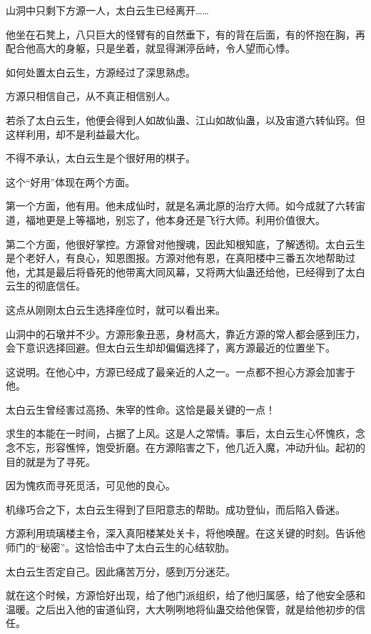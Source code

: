 
\begin{this_body}

山洞中只剩下方源一人，太白云生已经离开……

他坐在石凳上，八只巨大的怪臂有的自然垂下，有的背在后面，有的怀抱在胸，再配合他高大的身躯，只是坐着，就显得渊渟岳峙，令人望而心悸。

如何处置太白云生，方源经过了深思熟虑。

方源只相信自己，从不真正相信别人。

若杀了太白云生，他便会得到人如故仙蛊、江山如故仙蛊，以及宙道六转仙窍。但这样利用，却不是利益最大化。

不得不承认，太白云生是个很好用的棋子。

这个“好用”体现在两个方面。

第一个方面，他有用。他未成仙时，就是名满北原的治疗大师。如今成就了六转宙道，福地更是上等福地，别忘了，他本身还是飞行大师。利用价值很大。

第二个方面，他很好掌控。方源曾对他搜魂，因此知根知底，了解透彻。太白云生是个老好人，有良心，知恩图报。方源对他有恩，在真阳楼中三番五次地帮助过他，尤其是最后将昏死的他带离大同风幕，又将两大仙蛊还给他，已经得到了太白云生的彻底信任。

这点从刚刚太白云生选择座位时，就可以看出来。

山洞中的石墩并不少。方源形象丑恶，身材高大，靠近方源的常人都会感到压力，会下意识选择回避。但太白云生却却偏偏选择了，离方源最近的位置坐下。

这说明。在他心中，方源已经成了最亲近的人之一。一点都不担心方源会加害于他。

太白云生曾经害过高扬、朱宰的性命。这恰是最关键的一点！

求生的本能在一时间，占据了上风。这是人之常情。事后，太白云生心怀愧疚，念念不忘，形容憔悴，饱受折磨。在方源陷害之下，他几近入魔，冲动升仙。起初的目的就是为了寻死。

因为愧疚而寻死觅活，可见他的良心。

机缘巧合之下，太白云生得到了巨阳意志的帮助。成功登仙，而后陷入昏迷。

方源利用琉璃楼主令，深入真阳楼某处关卡，将他唤醒。在这关键的时刻。告诉他师门的“秘密”。这恰恰击中了太白云生的心结软肋。

太白云生否定自己。因此痛苦万分，感到万分迷茫。

就在这个时候，方源恰好出现，给了他门派组织，给了他归属感，给了他安全感和温暖。之后出入他的宙道仙窍，大大咧咧地将仙蛊交给他保管，就是给他初步的信任。


\end{this_body}
